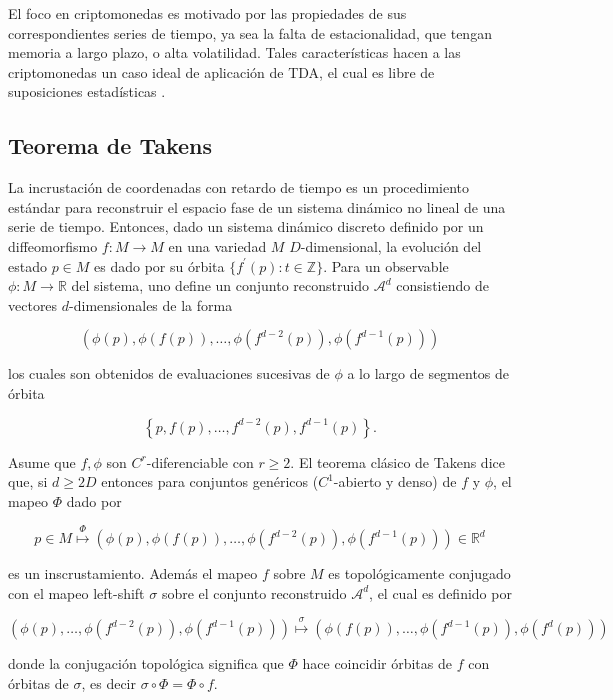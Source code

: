 El foco en criptomonedas es motivado por las propiedades de sus correspondientes series de tiempo, ya sea la falta de estacionalidad, que tengan memoria a largo plazo, o alta volatilidad. Tales características hacen a las criptomonedas un caso ideal de aplicación de TDA, el cual es libre de suposiciones estadísticas \cite{gideaTopologicalRecognitionCritical2020}.

\subsection{Teorema de Takens}

La incrustación de coordenadas con retardo de tiempo es un procedimiento estándar para reconstruir el espacio fase de un sistema dinámico no lineal de una serie de tiempo. Entonces, dado un sistema dinámico discreto definido por un diffeomorfismo $f:M \to M$ en una variedad $M$ $D$-dimensional, la evolución del estado $p\in M$ es dado por su órbita $\{f^{\prime}(p):t\in \mathbb{Z}\}$. Para un observable $\phi:M \to \mathbb{R}$ del sistema, uno define un conjunto reconstruido $\mathcal{A}^d$ consistiendo de vectores $d$-dimensionales de la forma  

\[
\left(\phi(p), \phi(f(p)), \ldots, \phi\left(f^{d-2}(p)\right), \phi\left(f^{d-1}(p)\right)\right)
\]

los cuales son obtenidos de evaluaciones sucesivas de $\phi$ a lo largo de segmentos de órbita

\[
\left\{p, f(p), \ldots, f^{d-2}(p), f^{d-1}(p)\right\}.
\]

Asume que $f,\phi$ son $C^r$-diferenciable con $r\geq 2$. El teorema clásico de Takens dice que, si $d\geq 2D$ entonces para conjuntos genéricos ($C^1$-abierto y denso) de $f$ y $\phi$, el mapeo $\Phi$ dado por

\[
p \in M \stackrel{\Phi}{\mapsto}\left(\phi(p), \phi(f(p)), \ldots, \phi\left(f^{d-2}(p)\right), \phi\left(f^{d-1}(p)\right)\right) \in \mathbb{R}^{d}
\]

es un inscrustamiento. Además el mapeo $f$ sobre $M$ es topológicamente conjugado con el mapeo left-shift $\sigma$ sobre el conjunto reconstruido $\mathcal{A}^d$, el cual es definido por

\[
\left(\phi(p), \ldots, \phi\left(f^{d-2}(p)\right), \phi\left(f^{d-1}(p)\right)\right) \stackrel{\sigma}{\mapsto}\left(\phi(f(p)), \ldots, \phi\left(f^{d-1}(p)\right), \phi\left(f^{d}(p)\right)\right)
\]

donde la conjugación topológica significa que $\Phi$ hace coincidir órbitas de $f$ con órbitas de $\sigma$, es decir $\sigma \circ \Phi = \Phi \circ f$.
   

